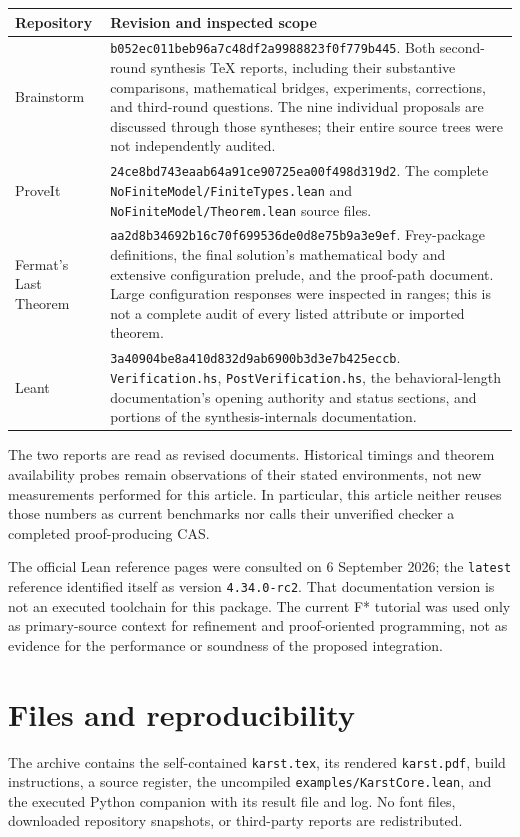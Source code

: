 \documentclass[11pt,letterpaper]{article}
\newcommand{\code}[1]{\nolinkurl{#1}}
\theoremstyle{remark}
\begin{document}
\begin{center}\small
\begin{tabularx}{\textwidth}{@{}P{1.15in}Y@{}}
\toprule
Repository & Revision and inspected scope\\
\midrule
Brainstorm & \code{b052ec011beb96a7c48df2a9988823f0f779b445}. Both second-round
synthesis TeX reports, including their substantive comparisons, mathematical
bridges, experiments, corrections, and third-round questions. The nine
individual proposals are discussed through those syntheses; their entire
source trees were not independently audited.\\
ProveIt & \code{24ce8bd743eaab64a91ce90725ea00f498d319d2}.
The complete \code{NoFiniteModel/FiniteTypes.lean} and
\code{NoFiniteModel/Theorem.lean} source files.\\
Fermat's Last Theorem & \code{aa2d8b34692b16c70f699536de0d8e75b9a3e9ef}.
Frey-package definitions, the final solution's mathematical body and extensive
configuration prelude, and the proof-path document. Large configuration
responses were inspected in ranges; this is not a complete audit of every
listed attribute or imported theorem.\\
Leant & \code{3a40904be8a410d832d9ab6900b3d3e7b425eccb}.
\code{Verification.hs}, \code{PostVerification.hs}, the behavioral-length
documentation's opening authority and status sections, and portions of the
synthesis-internals documentation.\\
\bottomrule
\end{tabularx}
\end{center}

The two reports are read as revised documents. Historical timings and theorem
availability probes remain observations of their stated environments, not new
measurements performed for this article. In particular, this article neither
reuses those numbers as current benchmarks nor calls their unverified checker
a completed proof-producing CAS.

The official Lean reference pages were consulted on 6 September 2026; the
\code{latest} reference identified itself as version \code{4.34.0-rc2}.
That documentation version is not an executed toolchain for this package.
The current F* tutorial was used only as primary-source context for refinement
and proof-oriented programming, not as evidence for the performance or
soundness of the proposed integration.

\section{Files and reproducibility}\label{app:repro}
The archive contains the self-contained \code{karst.tex}, its rendered
\code{karst.pdf}, build instructions, a source register, the uncompiled
\code{examples/KarstCore.lean}, and the executed Python companion with its
result file and log. No font files, downloaded repository snapshots, or
third-party reports are redistributed.
\end{document}
